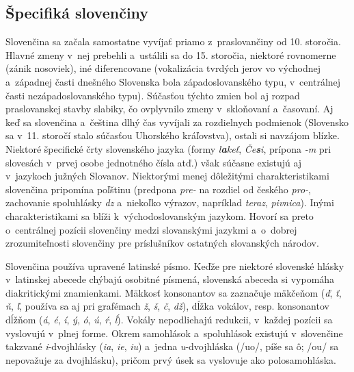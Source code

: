 \begin{multicols}{2}
\subsection{Špecifiká slovenčiny}
Slovenčina sa začala samostatne vyvíjať priamo z~praslovančiny od 10. storočia. Hlavné zmeny v~nej prebehli a~ustálili sa do 15. storočia, niektoré rovnomerne (zánik nosoviek), iné diferencovane (vokalizácia tvrdých jerov vo východnej a~západnej časti dnešného Slovenska bola západoslovanského typu, v~centrálnej časti nezápadoslovanského typu). Súčasťou týchto zmien bol aj rozpad praslovanskej stavby slabiky, čo ovplyvnilo zmeny v~skloňovaní a~časovaní. Aj keď sa slovenčina a~čeština dlhý čas vyvíjali za rozdielnych podmienok (Slovensko sa v~11. storočí stalo súčasťou Uhorského kráľovstva), ostali si navzájom blízke. Niektoré špecifické črty slovenského jazyka (formy \emph{l\textbf{a}keť}, \emph{Če\textbf{s}i}, prípona \emph{-m} pri slovesách v~prvej osobe jednotného čísla atď.) však súčasne existujú aj v~jazykoch južných Slovanov. Niektorými menej dôležitými charakteristikami slovenčina pripomína poľštinu (predpona \emph{pre-} na rozdiel od českého \emph{pro-}, zachovanie spoluhlásky \emph{dz} a~niekoľko výrazov, napríklad \emph{teraz}, \emph{pivnica}). Inými charakteristikami sa blíži k~východoslovanským jazykom. Hovorí sa preto o~centrálnej pozícii slovenčiny medzi slovanskými jazykmi a~o~dobrej zrozumiteľnosti slovenčiny pre príslušníkov ostatných slovanských národov.

Slovenčina používa upravené latinské písmo. Keďže pre niektoré slovenské hlásky v~latinskej abecede chýbajú osobitné písmená, slovenská abeceda si vypomáha diakritickými znamienkami. Mäkkosť konsonantov sa zaznačuje mäkčeňom (\emph{ď}, \emph{ť}, \emph{ň}, \emph{ľ}, používa sa aj pri grafémach \emph{ž}, \emph{š}, \emph{č}, \emph{dž}), dĺžka vokálov, resp. konsonantov dĺžňom (\emph{á}, \emph{é}, \emph{í}, \emph{ý}, \emph{ó}, \emph{ú}, \emph{ŕ}, \emph{ĺ}). Vokály nepodliehajú redukcii, v~každej pozícii sa vyslovujú v~plnej forme. Okrem samohlások a~spoluhlások existujú v~slovenčine takzvané \emph{i}-dvojhlásky (\emph{ia}, \emph{ie}, \emph{iu}) a~jedna \emph{u}-dvojhláska (/u\raisebox{-3pt}{\hspace{-4.5pt}\scalebox{0.4}{$\frown$}}o/, píše sa ô; /ou\raisebox{-3pt}{\hspace{-4.5pt}\scalebox{0.4}{$\frown$}}/ sa nepovažuje za dvojhlásku), pričom prvý úsek sa vyslovuje ako polosamohláska.



\end{multicols}
